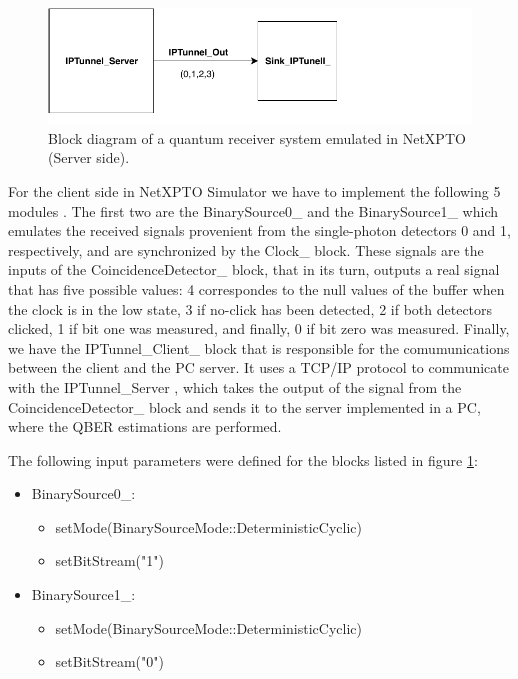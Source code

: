 \begin{refsection}
	\begin{figure}[H]
		\centering
		\includegraphics[width=0.9\linewidth]{./sdf/arduino_quantum_rx/figures/NetXPTO_2.pdf}
		\caption{Block diagram of a quantum receiver system emulated in NetXPTO (Server side).}
		\label{fig:netxpto}
	\end{figure}
	
	For the client side in NetXPTO Simulator we have to implement the following 5 modules . The first two are the BinarySource0\_ and the BinarySource1\_ which emulates the received signals provenient from the single-photon detectors 0 and 1, respectively, and are synchronized by the Clock\_ block. These signals are the inputs of the CoincidenceDetector\_ block, that in its turn, outputs a real signal that has five possible values: 4 correspondes to the null values of the buffer when the clock is in the low state, 3 if no-click has been detected, 2 if both detectors clicked, 1 if bit one was measured, and finally, 0 if bit zero was measured. Finally, we have the IPTunnel\_Client\_ block that is responsible for the comumunications between the client and the PC server. It uses a TCP/IP protocol to communicate with the IPTunnel\_Server , which takes the output of the signal from the CoincidenceDetector\_ block and sends it to the server implemented in a PC, where the QBER estimations are performed. 

	
	The following input parameters were defined for the blocks listed in figure \ref{fig:netxpto}: 
	
	\begin{itemize}
		\item BinarySource0\_:
		\begin{itemize}
			\item setMode(BinarySourceMode::DeterministicCyclic)
			\item setBitStream("1")
		\end{itemize}
	
		\item BinarySource1\_:
		\begin{itemize}
			\item setMode(BinarySourceMode::DeterministicCyclic)
			\item setBitStream("0")
		\end{itemize}
		

\end{itemize}
\end{refsection}
